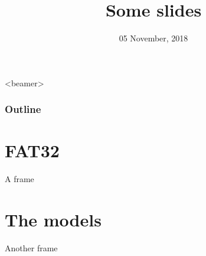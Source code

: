 \documentclass{beamer}
\title{Some slides}
\date{05 November, 2018}
\begin{document}
\begin{frame}[plain]
  \titlepage
\end{frame}

\begin{frame}<beamer>
  \frametitle{Outline}
  \tableofcontents
\end{frame}


\section{FAT32}

\begin{frame}{A frame}
\end{frame}

\section{The models}

\begin{frame}{Another frame}
\end{frame}
\end{document}
